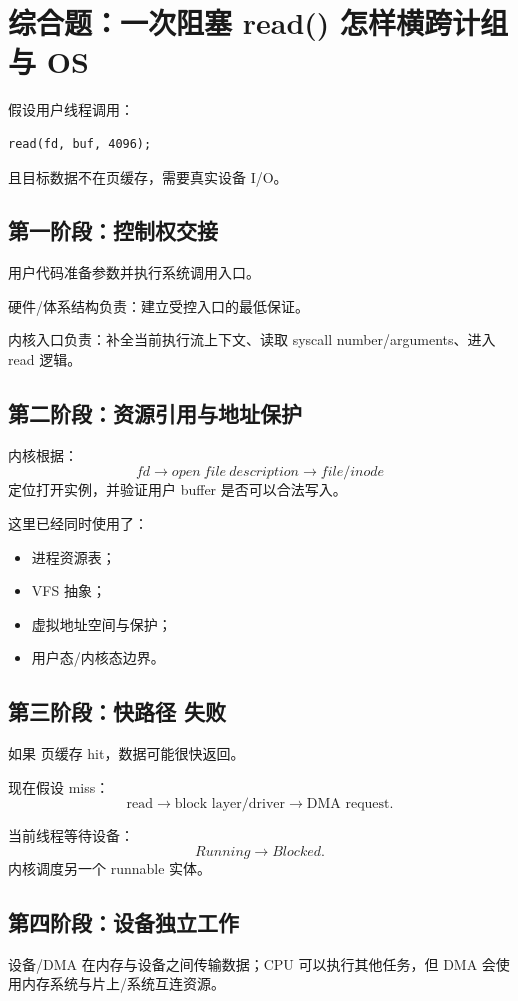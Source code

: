 \documentclass[11pt,a4paper]{ctexart}
\begin{document}
\section{综合题：一次阻塞 read() 怎样横跨计组与 OS}

假设用户线程调用：
\begin{verbatim}
read(fd, buf, 4096);
\end{verbatim}
且目标数据不在页缓存，需要真实设备 I/O。

\subsection{第一阶段：控制权交接}
用户代码准备参数并执行系统调用入口。

硬件/体系结构负责：建立受控入口的最低保证。

内核入口负责：补全当前执行流上下文、读取 syscall number/arguments、进入 read 逻辑。

\subsection{第二阶段：资源引用与地址保护}
内核根据：
\[
fd\rightarrow open\ file\ description\rightarrow file/inode
\]
定位打开实例，并验证用户 buffer 是否可以合法写入。

这里已经同时使用了：
\begin{itemize}
  \item 进程资源表；
  \item VFS 抽象；
  \item 虚拟地址空间与保护；
  \item 用户态/内核态边界。
\end{itemize}

\subsection{第三阶段：快路径 失败}
如果 页缓存 hit，数据可能很快返回。

现在假设 miss：
\[
\text{read}
\rightarrow
\text{block layer/driver}
\rightarrow
\text{DMA request}.
\]

当前线程等待设备：
\[
Running\rightarrow Blocked.
\]
内核调度另一个 runnable 实体。

\subsection{第四阶段：设备独立工作}
设备/DMA 在内存与设备之间传输数据；CPU 可以执行其他任务，但 DMA 会使用内存系统与片上/系统互连资源。
\end{document}
